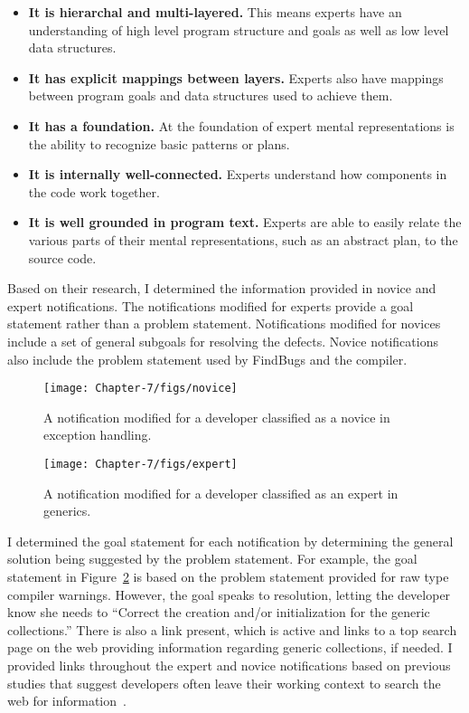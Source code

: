 \begin{itemize}
    \item \textbf{It is hierarchal and multi-layered.} This means experts have an understanding of high level program structure and goals as well as low level data structures.
    \item \textbf{It has explicit mappings between layers.} Experts also have mappings between program goals and data structures used to achieve them.
    \item \textbf{It has a foundation.} At the foundation of expert mental representations is the ability to recognize basic patterns or plans.
    \item \textbf{It is internally well-connected.} Experts understand how components in the code work together.
    \item \textbf{It is well grounded in program text.} Experts are able to easily relate the various parts of their mental representations, such as an abstract plan, to the source code.   
\end{itemize}

Based on their research, I determined the information provided in novice and expert notifications.
The notifications modified for experts provide a goal statement rather than a problem statement. 
Notifications modified for novices include a set of general subgoals for resolving the defects. 
Novice notifications also include the problem statement used by FindBugs and the compiler.


\begin{figure}
	\centering
	\texttt{[image: Chapter-7/figs/novice]}
	\caption{A notification modified for a developer classified as a novice in  exception handling.}
	\label{fig:novice}
\end{figure}

\begin{figure}
	\centering
	\texttt{[image: Chapter-7/figs/expert]}
	\caption{A notification modified for a developer classified as an expert in  generics.}
	\label{fig:expert}
\end{figure}

I determined the goal statement for each notification by determining the general solution being suggested by the problem statement. For example, the goal statement in Figure~\ref{fig:expert} is based on the problem statement provided for raw type compiler warnings. However, the goal speaks to resolution, letting the developer know she needs to ``Correct the creation and/or initialization for the generic collections.'' There is also a link present, which is active and links to a top search page on the web providing information regarding generic collections, if needed.
I provided links throughout the expert and novice notifications based on previous studies that suggest developers often leave their working context to search the web for information~\cite{johnson2016cross,nasehi2012makes}.

